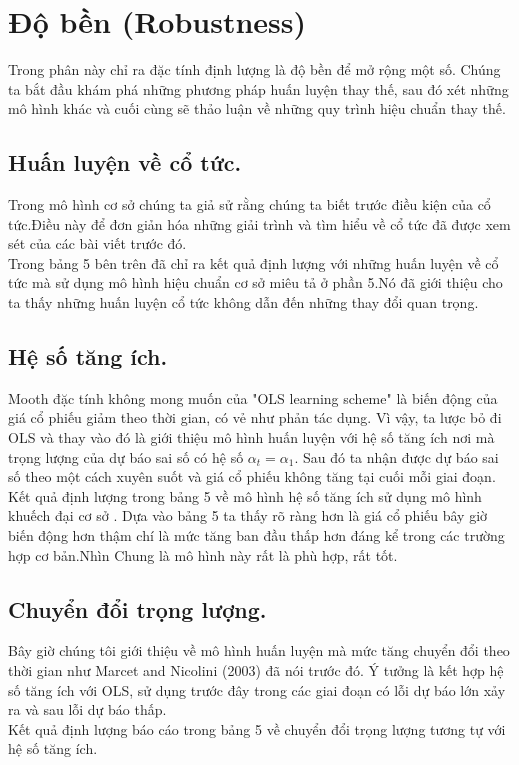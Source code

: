 \documentclass[10pt,a4paper]{article}
\begin{document}
\section{Độ bền (Robustness)}
Trong phân này chỉ ra đặc tính định lượng là độ bền để mở rộng một số. Chúng ta bắt đầu  khám phá những phương pháp huấn luyện thay thế, sau đó xét những mô hình khác và cuối cùng sẽ thảo luận về những quy trình hiệu chuẩn thay thế.\\
\subsection{Huấn luyện về cổ tức.}
\begin{figure}[!h]
	\centering
\end{figure}
Trong mô hình cơ sở chúng ta giả sử rằng chúng ta biết trước điều kiện của cổ tức.Điều này để đơn giản hóa những giải trình và tìm hiểu về cổ tức đã được xem sét của các bài viết trước đó.\\
Trong bảng 5 bên trên đã chỉ ra kết quả định lượng với những huấn luyện về cổ tức mà sử dụng mô hình hiệu chuẩn cơ sở miêu tả ở phần 5.Nó đã giới thiệu cho ta thấy những huấn luyện cổ tức không dẫn đến những thay đổi quan trọng.

\subsection{Hệ số tăng ích.}
Mooth đặc tính không mong muốn của "OLS learning scheme" là biến động của giá cổ phiếu giảm theo thời gian, có vẻ như phản tác dụng. Vì vậy, ta lược bỏ đi OLS và thay vào đó là giới thiệu mô hình huấn luyện với hệ số tăng ích nơi mà trọng lượng của dự báo sai số có hệ số $\alpha_t=\alpha_1$. Sau đó ta nhận được dự báo sai số theo một cách xuyên suốt  và giá cổ phiếu không tăng tại cuối mỗi giai đoạn.\\
Kết quả định lượng trong bảng 5 về mô hình hệ số tăng ích sử dụng mô hình khuếch đại cơ sở . Dựa vào bảng 5 ta thấy rõ ràng hơn là giá cổ phiếu bây giờ biến động hơn thậm chí là mức tăng ban đầu thấp hơn đáng kể trong các trường hợp cơ bản.Nhìn Chung là mô hình này rất là phù hợp, rất tốt.

\subsection{Chuyển đổi trọng lượng.}
Bây giờ chúng tôi giới thiệu về mô hình huấn luyện mà mức tăng chuyển đổi theo thời gian như  Marcet and Nicolini (2003) đã nói trước đó. Ý tưởng là kết hợp hệ số tăng ích với OLS, sử dụng trước đây trong các giai đoạn có lỗi dự báo lớn xảy ra và sau lỗi dự báo thấp.\\
Kết quả định lượng báo cáo trong bảng 5 về chuyển đổi trọng lượng tương tự với hệ số tăng ích.
\end{document}
